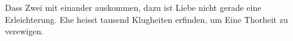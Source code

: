 Dass Zwei mit einander auskommen, dazu ist Liebe nicht gerade eine Erleichterung. Ehe heisst tausend Klugheiten erfinden, um Eine Thorheit zu verewigen.
\par

